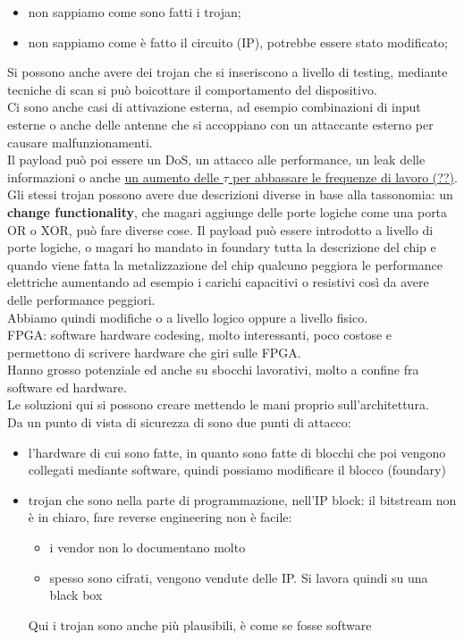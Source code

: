 \documentclass[oneside, 12pt]{extbook}
\begin{document}
\begin{itemize}
	\item non sappiamo come sono fatti i trojan;
	\item non sappiamo come è fatto il circuito (IP), potrebbe essere stato modificato;
\end{itemize}
Si possono anche avere dei trojan che si inseriscono a livello di testing, mediante tecniche di scan si può boicottare il comportamento del dispositivo.\\Ci sono anche casi di attivazione esterna, ad esempio combinazioni di input esterne o anche delle antenne che si accoppiano con un attaccante esterno per causare malfunzionamenti.\\Il payload può poi essere un DoS, un attacco alle performance, un leak delle informazioni o anche \underline{un aumento delle $\tau$ per abbassare le frequenze di lavoro (??)}.\\Gli stessi trojan possono avere due descrizioni diverse in base alla tassonomia: un \textbf{change functionality}, che magari aggiunge delle porte logiche come una porta OR o XOR, può fare diverse cose. Il payload può essere introdotto a livello di porte logiche, o magari ho mandato in foundary tutta la descrizione del chip e quando viene fatta la metalizzazione del chip qualcuno peggiora le performance elettriche aumentando ad esempio i carichi capacitivi o resistivi così da avere delle performance peggiori.\\Abbiamo quindi modifiche o a livello logico oppure a livello fisico.\\FPGA: software hardware codesing, molto interessanti, poco costose e permettono di scrivere hardware che giri sulle FPGA.\\Hanno grosso potenziale ed anche su sbocchi lavorativi, molto a confine fra software ed hardware.\\Le soluzioni qui si possono creare mettendo le mani proprio sull'architettura.\\Da un punto di vista di sicurezza di sono due punti di attacco:
\begin{itemize}
	\item l'hardware di cui sono fatte, in quanto sono fatte di blocchi che poi vengono collegati mediante software, quindi possiamo modificare il blocco (foundary)
	\item trojan che sono nella parte di programmazione, nell'IP block: il bitstream non è in chiaro, fare reverse engineering non è facile:
	\begin{itemize}
		\item i vendor non lo documentano molto
		\item spesso sono cifrati, vengono vendute delle IP. Si lavora quindi su una black box
	\end{itemize}
	Qui i trojan sono anche più plausibili, è come se fosse software
\end{itemize}
\end{document}
